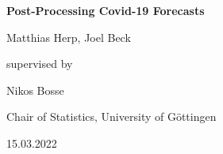 \begin{titlepage}
  \begin{center}
    \vspace*{1cm}
    
    \Huge
    \textbf{Post-Processing Covid-19 Forecasts}
    
    \vspace{1.5cm}
    
    Matthias Herp, Joel Beck
    
    \vspace{1.5cm}
    
    \Large
    supervised by
    
    \vspace{0.5cm}
    
    Nikos Bosse
    
    \vspace{2.5cm}
    
    Chair of Statistics, University of G\"ottingen
    
    \vspace{0.5cm}
    
    15.03.2022
            
  \end{center}
\end{titlepage}

\newpage

\renewcommand{\contentsname}{Table of Contents}
\setcounter{tocdepth}{2}
\tableofcontents

\newpage

